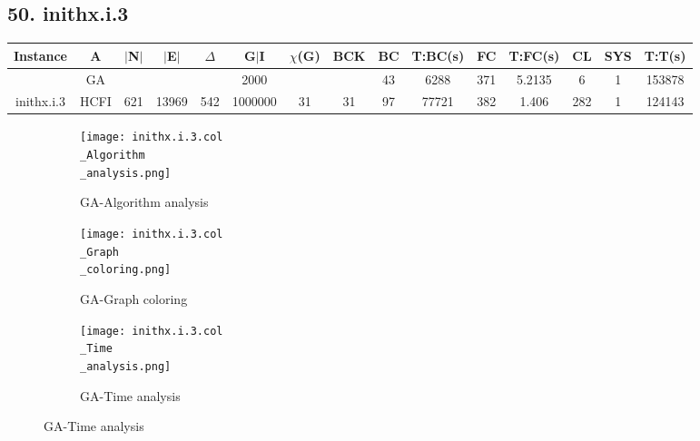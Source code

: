 \documentclass[10pt]{article}
\begin{document}
\subsection*{\hspace{0,9073976cm} 50. inithx.i.3}
\begin{table}[H]
\centering
\begin{tabular}{|c|c|c|c|c|c|c|c|c|c|c|c|c|c|c|}
\hline
Instance& A &$|$N$|$ & $|$E$|$ & $\Delta$ & G$|$I & $\chi$(G) &BCK&BC & T:BC(s) & FC & T:FC(s) & CL & SYS & T:T(s) \\ \hline \hline

	&GA&       &                   &                     &   2000      &     \cellcolor{yellow} & {\cellcolor{yellow}}& {{\cellcolor{green}43}}
&6288   &371        & 5.2135                  & 6                   &  1        &  153878      \\ \cline{2-2} \cline{6-6} \cline{9-15}
 \multirow{-2}{*}{inithx.i.3} &HCFI   &\multirow{-2}{*}{621}   &\multirow{-2}{*}{13969}     &\multirow{-2}{*}{542}     &1000000     &\multirow{-2}{*}{\cellcolor{yellow}31}      & \multirow{-2}{*}{\cellcolor{yellow}31}    &{\cellcolor{green}97}     &77721         &382    &1.406         &282    &1     &124143        \\ \hline 
\end{tabular}
\end{table}
\graphicspath{{./Core1/Solutions/GA/inithx.i.3.col}}
\begin{figure}[H]
\begin{subfigure}{.33\textwidth}
  \centering
  \texttt{[image: inithx.i.3.col\\\_Algorithm\\\_analysis.png]}
  \caption{GA-Algorithm analysis}
   \label{fig:subfig1}
\end{subfigure}%
\begin{subfigure}{.33\textwidth}
  \centering
  \texttt{[image: inithx.i.3.col\\\_Graph\\\_coloring.png]}
  \caption{GA-Graph coloring}
  \label{fig:subfig2}
\end{subfigure}
\begin{subfigure}{.33\textwidth}
  \centering
  \texttt{[image: inithx.i.3.col\\\_Time\\\_analysis.png]}
  \caption{GA-Time analysis}
  \end{subfigure}
\end{figure}
\end{document}
